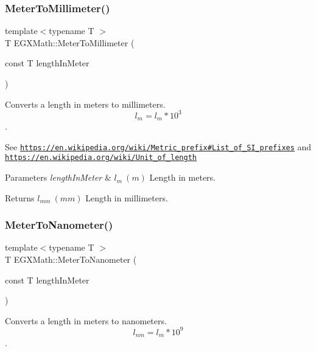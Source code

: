 \subsubsection{\texorpdfstring{Meter\+To\+Millimeter()}{MeterToMillimeter()}}
{\footnotesize\ttfamily template$<$typename T $>$ \\
T E\+G\+X\+Math\+::\+Meter\+To\+Millimeter (\begin{DoxyParamCaption}\item[{const T}]{length\+In\+Meter }\end{DoxyParamCaption})}



Converts a length in meters to millimeters. \[ l_{m}=l_{m} * 10^{3} \]. 

See \href{https://en.wikipedia.org/wiki/Metric_prefix#List_of_SI_prefixes}{\tt https\+://en.\+wikipedia.\+org/wiki/\+Metric\+\_\+prefix\#\+List\+\_\+of\+\_\+\+S\+I\+\_\+prefixes} and \href{https://en.wikipedia.org/wiki/Unit_of_length}{\tt https\+://en.\+wikipedia.\+org/wiki/\+Unit\+\_\+of\+\_\+length} 
\begin{DoxyParams}{Parameters}
{\em length\+In\+Meter} & $ l_{m}\ (m)$ Length in meters. \\
\hline
\end{DoxyParams}
\begin{DoxyReturn}{Returns}
$ l_{mm}\ (mm)$ Length in millimeters. 
\end{DoxyReturn}
\mbox{\label{group___e_g_x_math-_conversions-_length_conversions-_meter-_s_i_gad3532cd9d0a9b97ae34aadc0eea27c57}} 
\subsubsection{\texorpdfstring{Meter\+To\+Nanometer()}{MeterToNanometer()}}
{\footnotesize\ttfamily template$<$typename T $>$ \\
T E\+G\+X\+Math\+::\+Meter\+To\+Nanometer (\begin{DoxyParamCaption}\item[{const T}]{length\+In\+Meter }\end{DoxyParamCaption})}



Converts a length in meters to nanometers. \[ l_{nm}=l_{m} * 10^{9} \]. 


